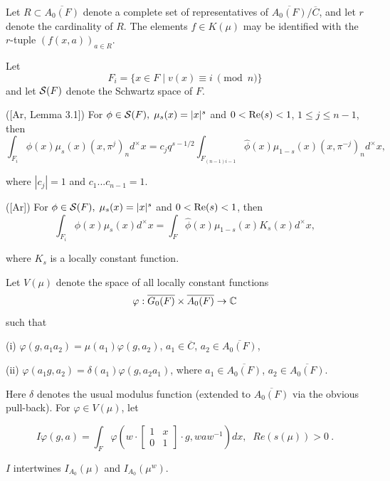 Let $R\subset \overline{A_0(F)}$ denote a complete set of representatives of 
$\overline{A_0(F)}/\overline{C}$, and let $r$ denote the cardinality of $R$.
The elements $f\in K(\mu )$ may be identified with the $r$-tuple $%
(f(x,a))_{a\in R}$.

Let 
\[
F_i=\{x\in F\;|\;v(x)\equiv i\ \pmod{n}\} 
\]
and let ${\cal S}(F)$ denote the Schwartz space of $F$.

\begin{lemma}
  ([Ar, Lemma 3.1]) For $\phi \in {\cal S}(F),\;\mu _s(x)=|x|^s$ and
  $0<{\rm Re}(s)<1$, $1\leq j\leq n-1$, then 
\[
\int_{F_i}\phi (x)\mu _s(x)(x,\pi ^j)_nd^{\times
}x=c_jq^{s-1/2}\int_{F_{(n-1)i-1}}\widehat{\phi }(x)\mu _{1-s}(x)(x,\pi
^{-j})_nd^{\times }x,
\]

where $|c_j|=1$ and $c_1...c_{n-1}=1$.
\end{lemma}

\begin{lemma}
([Ar]) For $\phi \in {\cal S}(F),\;\mu _s(x)=|x|^s$ and $0<{\rm Re}(s)<1$,
then 
\[
\int_{F_i}\phi (x)\mu _s(x)d^{\times }x=\int_F\widehat{\phi }(x)\mu
_{1-s}(x)K_s(x)d^{\times }x,
\]

where $K_s$ is a locally constant function.
\end{lemma}

Let $V(\mu )$ denote the space of all locally constant functions
\[
\varphi :\overline{G_0(F)}\times \overline{A_0(F)}\rightarrow {\Bbb C}
\]
such that

(i) $\varphi (g,a_1a_2)=\mu (a_1)\varphi (g,a_2)$, $a_1\in \overline{C}$,
$a_2\in \overline{A_0(F)}$,

(ii) $\varphi (a_1g,a_2)=\delta (a_1)\varphi (g,a_2a_1)$, where $a_1\in 
\overline{A_0(F)}$, $a_2\in \overline{A_0(F)}$.

Here $\delta $ denotes the usual modulus function (extended to
$\overline{A_0(F)}$ via the obvious pull-back). For
$\varphi \in V(\mu )$, let 

\[
I\varphi (g,a)=\int_F\varphi (w\cdot \left[ 
\begin{array}{cc}
1 & x \\ 
0 & 1
\end{array}
\right] \cdot g,waw^{-1})dx,\;\;Re(s(\mu ))>0\ . 
\]

\begin{lemma}
$I$ intertwines $I_{A_0}(\mu )$ and $I_{A_0}(\mu ^w)$.
\end{lemma}

